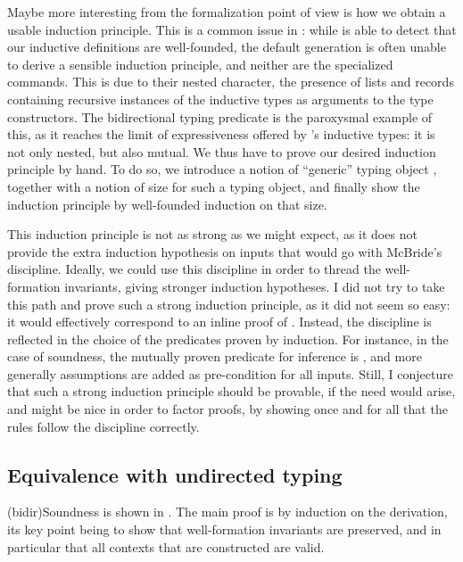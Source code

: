 Maybe more interesting from the formalization point of view is how we obtain a usable
induction principle. This is a common issue in : while
 is able to detect that our inductive definitions are well-founded,
the default generation is often unable to derive a sensible induction principle,
and neither are the  specialized commands. This is due to their nested
character, \ie the presence of lists and records containing recursive instances
of the inductive types as arguments to the type constructors.
The bidirectional typing predicate is the paroxysmal example of this, as it
reaches the limit of expressiveness offered by
’s inductive types: it is not only nested, but also mutual.
We thus have to prove our desired induction principle by
hand. To do so, we introduce a notion of “generic” typing object
,
together with a notion of size for such a typing object,
and finally show the induction principle
by well-founded induction on that size.

This induction principle is not as strong as we might expect, as it does not provide the extra induction hypothesis on inputs that would go with McBride's discipline.
Ideally, we could use this discipline
in order to thread the well-formation invariants, giving stronger induction
hypotheses. I did not try to take this path and prove such a strong induction principle,
as it did not seem so easy: it would effectively correspond to an inline proof
of .
Instead, the discipline is reflected in the choice of the predicates proven by induction.
For instance, in the case of soundness, the mutually proven predicate for inference
is , and more generally
assumptions are added as pre-condition for all inputs.
Still, I conjecture that such a strong induction principle should be provable, if the need
would arise, and might be nice in order to factor proofs, by showing once and for all that
the rules follow the discipline correctly.

\subsection{Equivalence with undirected typing}

\kl(bidir){Soundness}%
is shown in .
The main proof is by induction on the derivation,
its key point being to show that well-formation invariants are preserved, and in particular
that all contexts that are constructed are valid.


